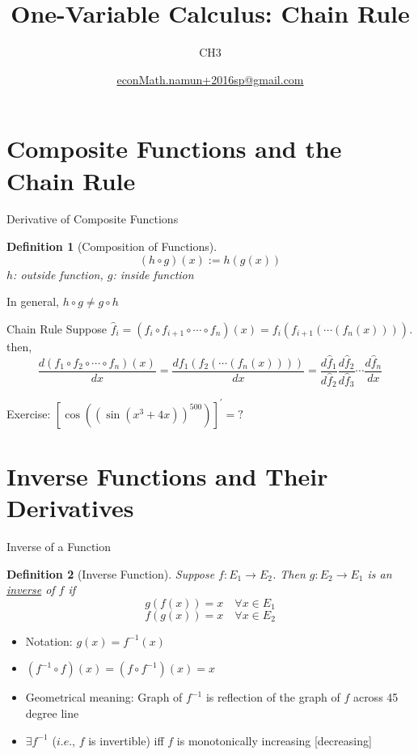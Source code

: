 \documentclass[a4paper,11pt]{article}
\author[조남운]{\url{econMath.namun+2016sp@gmail.com}}
\title{One-Variable Calculus: Chain Rule}
\subtitle{CH3}
\newtheorem{defn}{Definition}
\begin{document}
	\maketitle


\section{Composite Functions and the Chain Rule} %
\label{sec:composite_functions_and_the_chain_rule}

\begin{frame}[t]{Derivative of Composite Functions}
	\begin{defn}
		[Composition of Functions]
		\[
			( h\circ g )(x) := h(g(x))
		\]
		$h$: outside function, $g$: inside function
	\end{defn}
	In general, $h\circ g \neq g \circ h$
	\begin{block}
		{Chain Rule}
		Suppose $\hat f_i = (f_i \circ f_{i+1} \circ \cdots \circ f_n)(x)=f_i(f_{i+1}(\cdots(f_n(x))))$. then,
		\[
			\frac{d( f_1 \circ f_2 \circ \cdots \circ f_n)(x)}{dx}=\frac{df_1(f_2(\cdots(f_n(x))))}{dx}= \frac{d\hat f_1}{d\hat f_2}\frac{d\hat f_2}{d\hat f_3}\cdots\frac{d\hat f_n}{dx}
		\]
	\end{block}
		Exercise: $[\cos((\sin(x^3+4x))^{500})]^\prime =?$
\end{frame}



\section{Inverse Functions and Their Derivatives} %
\label{sec:inverse_functions_and_their_derivatives}

\begin{frame}[t]{Inverse of a Function}
	\begin{defn}
		[Inverse Function]
		Suppose $f:E_1 \rightarrow E_2$. Then $g:E_2\rightarrow E_1$ is an \uline{inverse} of $f$ if\[
			g(f(x))=x\quad \forall x\in E_1
		\]\[
						f(g(x))=x\quad \forall x\in E_2
		\]
	\end{defn}
	\begin{itemize}
		\item Notation: $g(x)=f^{-1}(x)$
		\item $(f^{-1}\circ f) (x) = (f\circ f^{-1}) (x)=x$
		\item Geometrical meaning: Graph of $f^{-1}$ is reflection of the graph of $f$ across 45 degree line
		\item $\exists f^{-1}$ ($i.e.$, $f$ is invertible) iff $f$ is monotonically increasing [decreasing]
	\end{itemize}
\end{frame}
\end{document}

